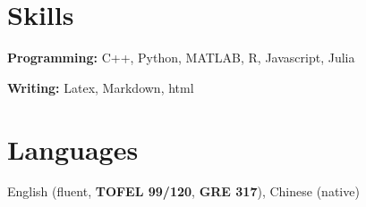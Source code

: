 \documentclass[letterpaper,11pt]{article}
\makeatletter
\newcommand{\resumeOrganizationHeading}[4]{
  \vspace{-2pt}\item
    \begin{tabular*}{0.97\textwidth}[t]{l@{\extracolsep{\fill}}r}
      \textbf{#1} & \textit{\small #2} \\
      \textit{\small#3}
    \end{tabular*}\vspace{-7pt}
}
\newcommand{\resumeSubHeadingListStart}{\begin{itemize}[leftmargin=0.15in, label={}]}
\newcommand{\resumeSubHeadingListEnd}{\end{itemize}}
\makeatother
\begin{document}
\section{Skills}
  \vspace{2pt}
  \resumeSubHeadingListStart
    \small{\item{
        \textbf{Programming:}{ C++, Python, MATLAB, R, Javascript, Julia} \\ \vspace{3pt}
        
        \textbf{Writing: }{Latex, Markdown, html} \\ \vspace{3pt}
        
    }}
  \resumeSubHeadingListEnd




\section{Languages}
  \vspace{2pt}
  English (fluent, \textbf{\textbf{TOFEL 99/120}}, \textbf{\textbf{GRE 317}}), Chinese (native)




    
    




    
    
\end{document}
